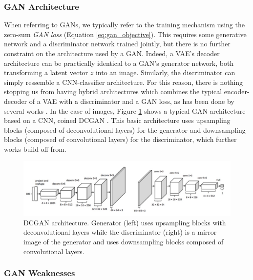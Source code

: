 \subsubsection{GAN Architecture}\label{sec:gan_architecture}
When referring to \ac{GAN}s, we typically refer 
to the training mechanism using the zero-sum \emph{GAN loss} (Equation \ref{eq:gan_objective}). This requires 
some generative network and a discriminator network trained jointly, but there is no further constraint on the 
architecture used by a \ac{GAN}.  Indeed, a \ac{VAE}'s decoder architecture can be practically identical
to a \ac{GAN}'s generator network, both transforming a latent vector $z$ into an image. Similarly, the 
discriminator can simply ressemble a CNN-classifier architecture. 
For this reason, there is nothing stopping us from having hybrid architectures which combines the 
typical encoder-decoder of a 
\ac{VAE} with a discriminator and a \ac{GAN} loss, as has been done by several works \citep{larsen2016autoencoding, 
donahue17iclr, dumoulin17iclr, xian2019f, esser2021taming}. In the case of images, Figure \ref{fig:dcgan} shows a typical \ac{GAN} architecture based 
on a \ac{CNN}, coined \ac{DCGAN} \citep{dcgan}. This basic architecture uses upsampling blocks 
(composed of deconvolutional layers) for the generator and downsampling blocks (composed of convolutional layers)
for the discriminator, which further works build off from. 

\begin{figure}[tb]
      \begin{center}
          \includegraphics[width=1.0\linewidth]{images/related/dcgan.jpg}
      \end{center}
      \caption{DCGAN architecture. Generator (left) uses upsampling blocks with deconvolutional layers while the discriminator 
      (right) is a mirror image of the generator and uses downsampling blocks composed of convolutional layers.}
      \label{fig:dcgan}
  \end{figure}


\subsubsection{GAN Weaknesses}\label{subsubsection:gan_weaknesses}

